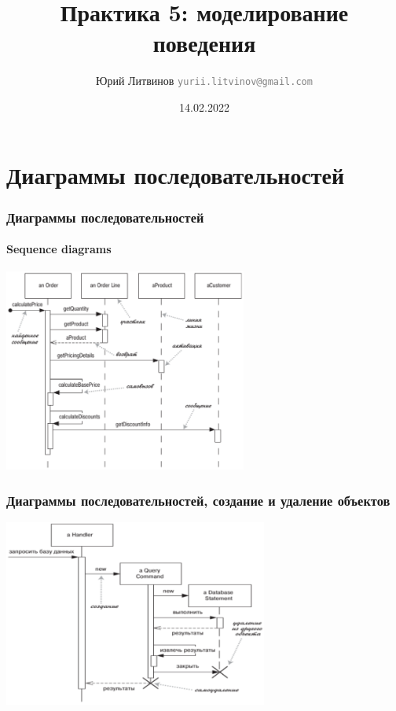 \documentclass[xetex,mathserif,serif]{beamer}
\title{Практика 5: моделирование поведения}
\author[Юрий Литвинов]{Юрий Литвинов \newline \textcolor{gray}{\small\texttt{yurii.litvinov@gmail.com}}}
\date{14.02.2022}
\begin{document}
    \frame{\titlepage}

    \section{Диаграммы последовательностей}

    \begin{frame}
        \frametitle{Диаграммы последовательностей}
        \framesubtitle{Sequence diagrams}
        \begin{center}
            \includegraphics[width=0.6\textwidth]{sequenceDiagram.png}
        \end{center}
    \end{frame}

    \begin{frame}
        \frametitle{Диаграммы последовательностей, создание и удаление объектов}
        \begin{center}
            \includegraphics[width=0.65\textwidth]{sequenceLifeCycle.png}
        \end{center}
    \end{frame}
\end{document}
